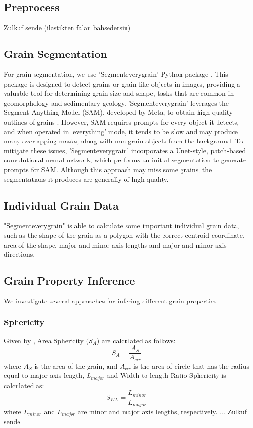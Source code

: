 \documentclass{article}
\begin{document}
\subsection{Preprocess}
Zulkuf sende (ilastikten falan bahsedersin)

\subsection{Grain Segmentation}
For grain segmentation, we use 'Segmenteverygrain' Python package \citep{zsylvester_segmenteverygrain_2023}. This package is designed to detect grains or grain-like objects in images, providing a valuable tool for determining grain size and shape, tasks that are common in geomorphology and sedimentary geology. 'Segmenteverygrain' leverages the Segment Anything Model (SAM), developed by Meta, to obtain high-quality outlines of grains \citep{kirillov2023segany}. However, SAM requires prompts for every object it detects, and when operated in 'everything' mode, it tends to be slow and may produce many overlapping masks, along with non-grain objects from the background. To mitigate these issues, 'Segmenteverygrain' incorporates a Unet-style, patch-based convolutional neural network, which performs an initial segmentation to generate prompts for SAM. Although this approach may miss some grains, the segmentations it produces are generally of high quality.

\subsection{Individual Grain Data}
"Segmenteverygrain" is able to calculate some important individual grain data, such as the shape of the grain as a polygon with the correct centroid coordinate, area of the shape, major and minor axis lengths and major and minor axis directions.

\subsection{Grain Property Inference}
We investigate several approaches for infering different grain properties.
\subsubsection{Sphericity}
Given by \citet{zheng2015traditional}, Area Sphericity ($S_{A}$) are calculated as follows:
$$S_{A}=\frac{A_{S}}{A_{cir}}$$
where $A_{S}$ is the area of the grain, and $A_{cir}$ is the area of circle that has the radius equal to major axis length, $L_{major}$
and Width-to-length Ratio Sphericity is calculated as:
$$S_{WL}=\frac{L_{minor}}{L_{major}}$$
where $L_{minor}$ and $L_{major}$ are minor and major axis lengths, respectively.
\citet{wadell1932volume} ... Zulkuf sende
\end{document}
